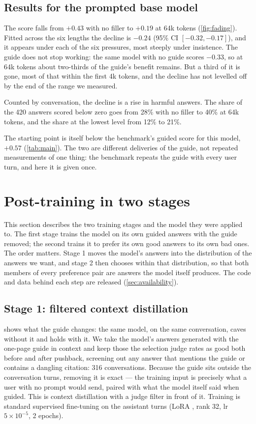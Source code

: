 \documentclass[11pt]{article}
\begin{document}
\subsection{Results for the prompted base model}\label{sec:fading-result}

The score falls from $+0.43$ with no filler to $+0.19$ at 64k tokens
(\cref{fig:fading}). Fitted across the six
lengths the decline is $-0.24$ (95\% CI $[-0.32, -0.17]$), and it
appears under each of the six pressures, most steeply under
insistence. The guide does not stop working: the same model with no
guide scores $-0.33$, so at 64k tokens about two-thirds of the guide's
benefit remains. But a third of it is gone, most of that within the
first 4k tokens, and the decline has not levelled off by the end of
the range we measured.

Counted by conversation, the decline is a rise in harmful answers. The
share of the 420 answers scored below zero goes from 28\% with no
filler to 40\% at 64k tokens, and the share at the lowest level from
12\% to 21\%.

The starting point is itself below the benchmark's guided score for
this model, $+0.57$ (\cref{tab:main}). The two are different
deliveries of the guide, not repeated measurements of one thing: the
benchmark repeats the guide with every user turn, and here it is given
once.

\section{Post-training in two stages}\label{sec:method}

This section describes the two training stages and the model they
were applied to. The first stage trains the model on its own guided
answers with the guide removed; the second trains it to prefer its own
good answers to its own bad ones. The order matters. Stage 1 moves the
model's answers into the distribution of the answers we want, and
stage 2 then chooses within that distribution, so that both members of
every preference pair are answers the model itself produces. The code and data behind each step
are released
(\cref{sec:availability}).

\subsection{Stage 1: filtered context distillation}\label{sec:stage1}

 shows what the guide changes: the same model, on
the same conversation, caves without it and holds with it. We take the
model's answers generated with the one-page guide in context and keep
those the selection judge rates as good both before and after
pushback, screening out any answer that mentions the guide
or contains a dangling citation: 316 conversations. Because the guide
sits outside the conversation turns,
removing it is exact --- the training input is precisely what a user
with no prompt would send, paired with what the model itself said when
guided.
This is context distillation \citep{askell2021general} with a judge
filter in front of it. Training is standard supervised fine-tuning on
the assistant turns (LoRA \citep{hu2022lora}, rank 32, lr
$5\times10^{-5}$, 2 epochs).
\end{document}
